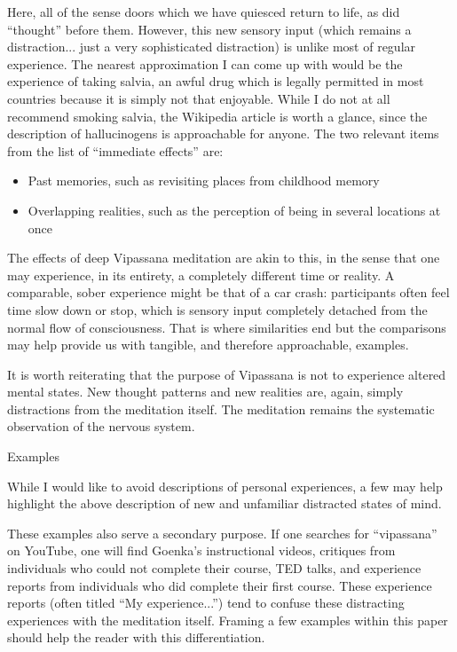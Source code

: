 \documentclass{article}
\begin{document}
Here, all of the sense doors which we have quiesced return to life, as did ``thought'' before them. However, this new sensory input (which remains a distraction... just a very sophisticated distraction) is unlike most of regular experience. The nearest approximation I can come up with would be the experience of taking salvia, an awful drug which is legally permitted in most countries because it is simply not that enjoyable. While I do not at all recommend smoking salvia, the Wikipedia article \cite{salvia} is worth a glance, since the description of hallucinogens is approachable for anyone. The two relevant items from the list of ``immediate effects'' are:

\begin{itemize}
  \item Past memories, such as revisiting places from childhood memory
  \item Overlapping realities, such as the perception of being in several locations at once
\end{itemize}

The effects of deep Vipassana meditation are akin to this, in the sense that one may experience, in its entirety, a completely different time or reality. A comparable, sober experience might be that of a car crash: participants often feel time slow down or stop, which is sensory input completely detached from the normal flow of consciousness. That is where similarities end but the comparisons may help provide us with tangible, and therefore approachable, examples.

It is worth reiterating that the purpose of Vipassana is not to experience altered mental states. New thought patterns and new realities are, again, simply distractions from the meditation itself. The meditation remains the systematic observation of the nervous system.


\pagebreak

\begin{center}
  \Huge{Examples}
\end{center}

While I would like to avoid descriptions of personal experiences, a few may help highlight the above description of new and unfamiliar distracted states of mind.

These examples also serve a secondary purpose. If one searches for ``vipassana'' on YouTube, one will find Goenka's instructional videos, critiques from individuals who could not complete their course, TED talks, and experience reports from individuals who did complete their first course. These experience reports (often titled ``My experience...'') tend to confuse these distracting experiences with the meditation itself. Framing a few examples within this paper should help the reader with this differentiation.
\end{document}
